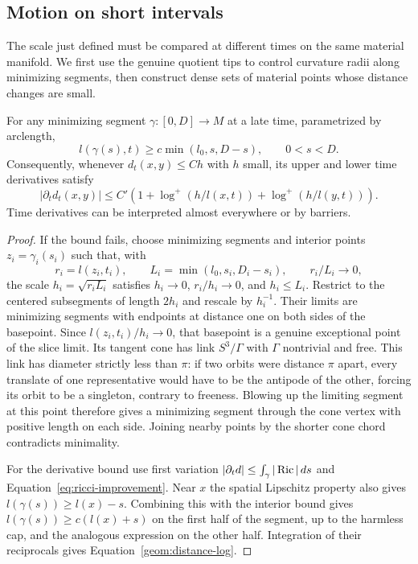 \subsection{Motion on short intervals}

The scale just defined must be compared at different times on the same
material manifold. We first use the genuine quotient tips to control
curvature radii along minimizing segments, then construct dense sets of
material points whose distance changes are small.
\begin{lemma}\label{geom:geodesic-radius}
For any minimizing segment $\gamma:[0,D]\to M$ at a late time,
parametrized by arclength,
\[
 l(\gamma(s),t)\geq c\min(l_0,s,D-s),\qquad 0<s<D.
\]
Consequently, whenever $d_t(x,y)\leq Ch$ with $h$ small, its upper
and lower time derivatives satisfy
\begin{equation}\label{geom:distance-log}
 |\partial_t d_t(x,y)|\leq
 C'\left(1+\log^+(h/l(x,t))+\log^+(h/l(y,t))\right).
\end{equation}
Time derivatives can be interpreted almost everywhere or by barriers.
\end{lemma}

\begin{proof}
If the bound fails, choose minimizing segments and interior points
$z_i=\gamma_i(s_i)$ such that, with
\[
 r_i=l(z_i,t_i),\qquad L_i=\min(l_0,s_i,D_i-s_i),
 \qquad r_i/L_i\longrightarrow0,
\]
the scale $h_i=\sqrt{r_iL_i}$ satisfies
$h_i\to0$, $r_i/h_i\to0$, and $h_i\le L_i$.
Restrict to the centered subsegments of length $2h_i$ and rescale
by $h_i^{-1}$. Their limits are minimizing segments with endpoints
at distance one on both sides of the basepoint. Since $l(z_i,t_i)/h_i\to0$,
that basepoint is a genuine exceptional point of the slice limit.
Its tangent cone has link $S^3/\Gamma$ with $\Gamma$ nontrivial and free.
This link has diameter strictly less than $\pi$: if two orbits were
distance $\pi$ apart, every translate of one representative would
have to be the antipode of the other, forcing its orbit to be a
singleton, contrary to freeness. Blowing up the limiting segment at
this point therefore gives a minimizing segment through the cone
vertex with positive length on each side. Joining nearby points by
the shorter cone chord contradicts minimality.

For the derivative bound use first variation
$|\partial_t d|\leq\int_\gamma|\operatorname{Ric}|\,ds$ and
Equation~\eqref{eq:ricci-improvement}. Near $x$ the spatial
Lipschitz property also gives $l(\gamma(s))\geq l(x)-s$.
Combining this with the interior bound gives
$l(\gamma(s))\geq c(l(x)+s)$ on the first half of the segment,
up to the harmless cap, and the analogous expression on the other
half. Integration of their reciprocals gives
Equation~\eqref{geom:distance-log}.
\end{proof}

